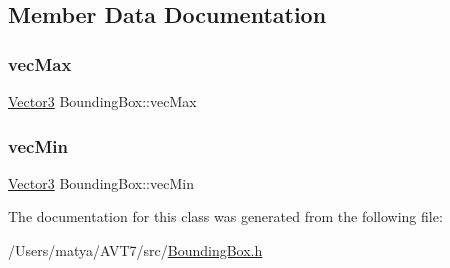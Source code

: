 \subsection{Member Data Documentation}
\mbox{\label{class_bounding_box_a989d472955b679844ea9e48e888c5136}} 
\subsubsection{\texorpdfstring{vec\+Max}{vecMax}}
{\footnotesize\ttfamily \hyperlink{class_vector3}{Vector3} Bounding\+Box\+::vec\+Max}

\mbox{\label{class_bounding_box_aa8c7acb6b1bd2ddb83473cf35e53156e}} 
\subsubsection{\texorpdfstring{vec\+Min}{vecMin}}
{\footnotesize\ttfamily \hyperlink{class_vector3}{Vector3} Bounding\+Box\+::vec\+Min}



The documentation for this class was generated from the following file\+:\begin{DoxyCompactItemize}
\item 
/\+Users/matya/\+A\+V\+T7/src/\hyperlink{_bounding_box_8h}{Bounding\+Box.\+h}\end{DoxyCompactItemize}
